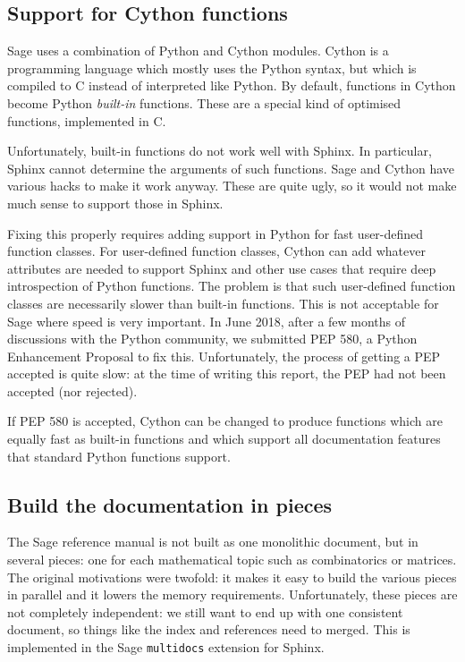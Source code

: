 \documentclass{deliverablereport}
\begin{document}
\subsection{Support for Cython functions}

Sage uses a combination of Python and Cython modules.
Cython is a programming language which mostly uses the Python syntax,
but which is compiled to C instead of interpreted like Python.
By default, functions in Cython become Python \emph{built-in} functions.
These are a special kind of optimised functions, implemented in C.

Unfortunately, built-in functions do not work well with Sphinx.
In particular, Sphinx cannot determine the arguments of such functions.
Sage and Cython have various hacks to make it work anyway.
These are quite ugly, so it would not make much sense to support those in Sphinx.

Fixing this properly requires adding support in Python
for fast user-defined function classes.
For user-defined function classes, Cython can add whatever attributes
are needed to support Sphinx and other use cases that require deep introspection
of Python functions.
The problem is that such user-defined function classes
are necessarily slower than built-in functions.
This is not acceptable for Sage where speed is very important.
In June 2018, after a few months of discussions with the Python
community,
we submitted PEP 580, a Python Enhancement Proposal to fix this.
Unfortunately, the process of getting a PEP accepted is quite slow:
at the time of writing this report, the PEP had not been accepted (nor rejected).

If PEP 580 is accepted, Cython can be changed to produce
functions which are equally fast as built-in functions
and which support all documentation
features that standard Python functions support.

\subsection{Build the documentation in pieces}

The Sage reference manual is not built as one monolithic document,
but in several pieces:
one for each mathematical topic such as combinatorics or matrices.
The original motivations were twofold: it makes it easy to build the various pieces
in parallel and it lowers the memory requirements.
Unfortunately, these pieces are not completely independent:
we still want to end up with one consistent document,
so things like the index and references need to merged.
This is implemented in the Sage \texttt{multidocs} extension for Sphinx.
\end{document}
